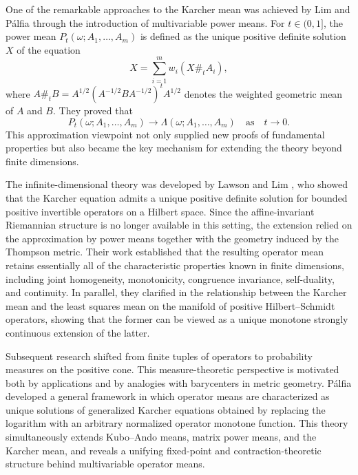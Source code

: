 \documentclass[12pt,reqno]{amsart}
\begin{document}
One of the remarkable approaches to the Karcher mean was achieved by Lim and Pálfia \cite{LP12} through the introduction of  multivariable power means.
For $t \in (0,1]$, the power mean $P_t(\omega; A_1, \ldots, A_m)$ is defined as the unique positive definite solution $X$ of the equation
\begin{displaymath}
X = \sum_{i=1}^{m} w_i (X \#_t A_i),
\end{displaymath}
where $A \#_t B = A^{1/2} (A^{-1/2} B A^{-1/2})^{t} A^{1/2}$ denotes the weighted geometric mean of $A$ and $B$.
They proved that
\begin{displaymath}
P_t(\omega; A_1, \ldots, A_m) \longrightarrow \Lambda(\omega; A_1, \ldots, A_m) \quad \textrm{as} \quad t \to 0.
\end{displaymath}
This approximation viewpoint not only supplied new proofs of fundamental properties but also became the key mechanism for extending the theory beyond finite dimensions.

The infinite-dimensional theory was developed by Lawson and Lim \cite{LL14}, who showed that the Karcher equation admits a unique positive definite solution for bounded positive invertible operators on a Hilbert space. Since the affine-invariant Riemannian structure is no longer available in this setting, the extension relied on the approximation by power means together with the geometry induced by the Thompson metric. Their work established that the resulting operator mean retains essentially all of the characteristic properties known in finite dimensions, including joint homogeneity, monotonicity, congruence invariance, self-duality, and continuity. In parallel, they clarified in \cite{LL} the relationship between the Karcher mean and the least squares mean on the manifold of positive Hilbert–Schmidt operators, showing that the former can be viewed as a unique monotone strongly continuous extension of the latter.

Subsequent research shifted from finite tuples of operators to probability measures on the positive cone. This measure-theoretic perspective is motivated both by applications and by analogies with barycenters in metric geometry. P\'{a}lfia \cite{palfia2} developed a general framework in which operator means are characterized as unique solutions of generalized Karcher equations obtained by replacing the logarithm with an arbitrary normalized operator monotone function. This theory simultaneously extends Kubo–Ando means, matrix power means, and the Karcher mean, and reveals a unifying fixed-point and contraction-theoretic structure behind multivariable operator means.
\end{document}
